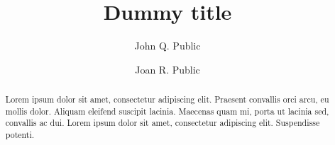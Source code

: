 \documentclass[a4paper,UKenglish]{templates/lipics-v2018-authors/lipics-v2018}
\title{Dummy title}
\author{John Q. Public}{Dummy University Computing Laboratory, [Address], Country}{johnqpublic@dummyuni.org}{https://orcid.org/0000-0002-1825-0097}{[funding]}%
\author{Joan R. Public}{Department of Informatics, Dummy College, [Address], Country}{joanrpublic@dummycollege.org}{[orcid]}{[funding]}
\begin{document}
\maketitle

\begin{abstract}
Lorem ipsum dolor sit amet, consectetur adipiscing elit. Praesent
	convallis orci arcu, eu mollis dolor. Aliquam eleifend
	suscipit lacinia. Maecenas quam mi, porta ut lacinia sed,
	convallis ac dui. Lorem ipsum dolor sit amet, consectetur
	adipiscing elit. Suspendisse potenti.
\end{abstract}







\end{document}
